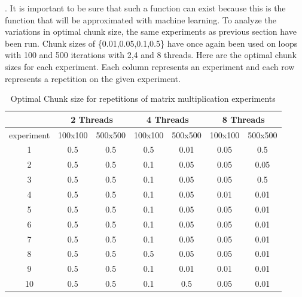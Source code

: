  . It is important to be sure that such a function can exist because this is the function that will be approximated with machine learning. To analyze the variations in optimal chunk size, the same experiments as previous section have been run. Chunk sizes of \{0.01,0.05,0.1,0.5\} have once again been used on loops with 100 and 500 iterations with 2,4 and 8 threads. Here are the optimal chunk sizes for each experiment. Each column represents an experiment and each row represents a repetition on the given experiment.
\begin{table}[H]
	\centering
	\caption{Optimal Chunk size for repetitions of matrix multiplication experiments}
	\label{my-label}
	\begin{tabular}{|c|c|c|c|c|c|c|}
		\hline
		&
		\multicolumn{2}{|c|}{2 Threads} & \multicolumn{2}{c|}{4 Threads} & \multicolumn{2}{c|}{8 Threads} \\ \hline
		experiment&100x100       & 500x500       & 100x100       & 500x500      & 100x100       & 500x500      \\ \hline
		1&0.5            & 0.5            & 0.5            & 0.01          & 0.05           & 0.5           \\ \hline
		2&0.5            & 0.5            & 0.1            & 0.05          & 0.05           & 0.05          \\ \hline
		3&0.5            & 0.5            & 0.1            & 0.05          & 0.05           & 0.5           \\ \hline
		4&0.5            & 0.5            & 0.1            & 0.05          & 0.01           & 0.01          \\ \hline
		5&0.5            & 0.5            & 0.1            & 0.05          & 0.05           & 0.01          \\ \hline
		6&0.5            & 0.5            & 0.1            & 0.05          & 0.05           & 0.01          \\ \hline
		7&0.5            & 0.5            & 0.1            & 0.05          & 0.05           & 0.01          \\ \hline
		8&0.5            & 0.5            & 0.5            & 0.05          & 0.05           & 0.01          \\ \hline
		9&0.5            & 0.5            & 0.1            & 0.01          & 0.01           & 0.01          \\ \hline
		10&0.5            & 0.5            & 0.1            & 0.5           & 0.05           & 0.01          \\ \hline
	\end{tabular}
\end{table}

